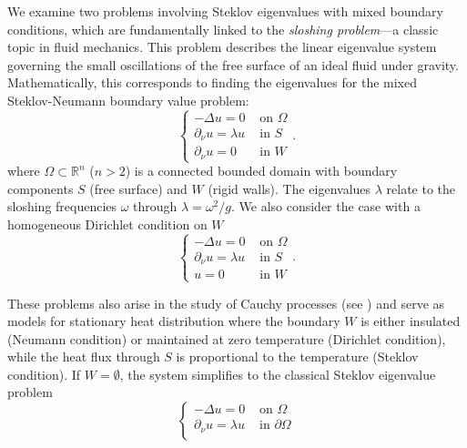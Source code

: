 \documentclass[a4paper,reqno,11pt,oneside]{amsart}
\theoremstyle{plain}
\theoremstyle{plain}
\theoremstyle{plain}
\theoremstyle{remark}
\begin{document}
We examine two problems involving Steklov eigenvalues with mixed boundary conditions, which are fundamentally linked to the {\em sloshing problem}—a classic topic in fluid mechanics. This problem describes the linear eigenvalue system governing the small oscillations of the free surface of an ideal fluid under gravity. Mathematically, this corresponds to finding the eigenvalues for the mixed Steklov-Neumann boundary value problem:
 \begin{equation}\label{Slosh0}  
   \left\{
    \begin{array}{cc}
         -\Delta u=0& \text{ on } \Omega\\
        \partial_\nu u=\lambda u & \text{ in } S\\
        \partial_\nu u=0 & \text{ in }  W
    \end{array}.
    \right.
\end{equation}
where $\Omega \subset \mathbb{R}^n$ ($n > 2$) is a connected bounded domain with boundary components $S$ (free surface) and $W$ (rigid walls). The eigenvalues $\lambda$ relate to the sloshing frequencies $\omega$ through $\lambda = \omega^2/g$. We also consider the case with a homogeneous Dirichlet condition on $W$ 
\begin{equation}\label{Slosh} 
   \left\{
    \begin{array}{cc}
         -\Delta u=0& \text{ on } \Omega\\
        \partial_\nu u=\lambda u & \text{ in } S\\
      u=0  & \text{ in }  W
    \end{array}.
    \right.
 \end{equation}

These problems also arise in the study of Cauchy processes (see \cite{baku}) and serve as models for stationary heat distribution where the boundary $W$ is either insulated  (Neumann condition) or maintained at zero temperature (Dirichlet condition), while the heat flux through $S$ is proportional to the temperature (Steklov condition). If $W = \emptyset$, the system simplifies to the classical Steklov eigenvalue problem
\begin{equation}\label{eq:steklov} 
   \left\{
    \begin{array}{cc}
         -\Delta u=0& \text{ on } \Omega\\
        \partial_\nu u =\lambda u & \text{ in } \partial\Omega\\
    \end{array}
    \right.
\end{equation}
\end{document}
